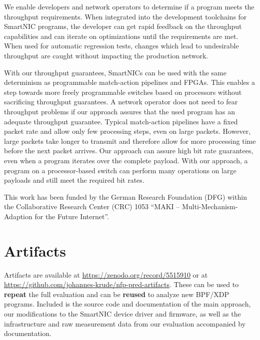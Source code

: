 \documentclass[sigconf,screen,authordraft]{acmart}
\begin{document}
We enable developers and network operators to determine if a program meets the throughput requirements.
When integrated into the development toolchains for SmartNIC programs, the developer can get rapid feedback on the throughput capabilities and can iterate on optimizations until the requirements are met.
When used for automatic regression tests, changes which lead to undesirable throughput are caught without impacting the production network.

With our throughput guarantees, SmartNICs can be used with the same determinism as programmable match-action pipelines and FPGAs.
This enables a step towards more freely programmable switches based on processors without sacrificing throughput guarantees.
A network operator does not need to fear throughput problems if our approach assures that the used program has an adequate throughput guarantee.
Typical match-action pipelines have a fixed packet rate and allow only few processing steps, even on large packets.
However, large packets take longer to transmit and therefore allow for more processing time before the next packet arrives.
Our approach can assure high bit rate guarantees, even when a program iterates over the complete payload.
With our approach, a program on a processor-based switch can perform many operations on large payloads and still meet the required bit rates.


\begin{acks}
This work has been funded by the German Research Foundation (DFG) within the Collaborative Research Center (CRC) 1053 ``MAKI -- Multi-Mechanism-Adaption for the Future Internet''.
\end{acks}

%





\appendix

\section{Artifacts}
\label{sec:artifacts}

Artifacts are available at \url{https://zenodo.org/record/5515910} or at \url{https://github.com/johannes-krude/nfp-pred-artifacts}.
These can be used to \textbf{repeat} the full evaluation and can be \textbf{reused} to analyze new BPF/XDP programs.
Included is the source code and documentation of the main approach, our modifications to the SmartNIC device driver and firmware, as well as the infrastructure and raw measurement data from our evaluation accompanied by documentation.
\end{document}

